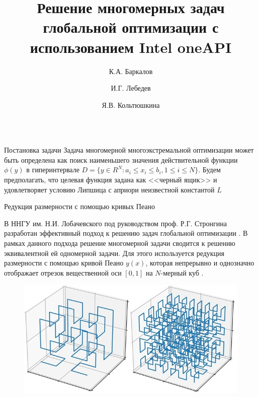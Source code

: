 \documentclass{beamer}
\title{Решение многомерных задач глобальной оптимизации с использованием Intel oneAPI }
\author{К.А. Баркалов \and И.Г. Лебедев \and Я.В. Кольтюшкина}
\institute{Нижегородский государственный университет им. Н.И. Лобачевского}
\begin{document}
\begin{frame}[t]
    \begin{columns}[t]
        \begin{column}[t]{0.48\paperwidth}
            \begin{block}{Постановка задачи}
             Задача многомерной многоэкстремальной оптимизации может быть определена как поиск наименьшего значения действительной функции \(\phi(y)\)  в гиперинтервале \(D=\{y\in R^N:a_i\leqslant x_i\leqslant{b_i}, 1\leqslant{i}\leqslant{N}\}\). 
Будем предполагать, что целевая функция задана как <<черный ящик>> и удовлетворяет условию Липшица с априори неизвестной константой \(L\)

          \end{block}
          
          \begin{block}{Редукция размерности с помощью кривых Пеано}

В ННГУ им. Н.И. Лобачевского под руководством проф. Р.Г. Стронгина разработан эффективный подход к решению задач глобальной оптимизации \cite{Strongin2013}. В рамках данного подхода решение многомерной задачи сводится к решению эквивалентной ей одномерной задачи. Для этого используется редукция размерности с помощью кривой Пеано \(y(x)\), которая непрерывно и однозначно отображает отрезок вещественной оси \([0,1]\) на \(N\)-мерный куб \cite{Sergeyev2013}.

 \begin{minipage}[t]{.48\textwidth}
              \begin{figure}
                  \centering
                  \includegraphics[scale=1.27]{images/pean_2.jpg}
              \end{figure}
              \end{minipage}
              



\end{block}
\end{column}
\end{columns}
\end{frame}
\end{document}
